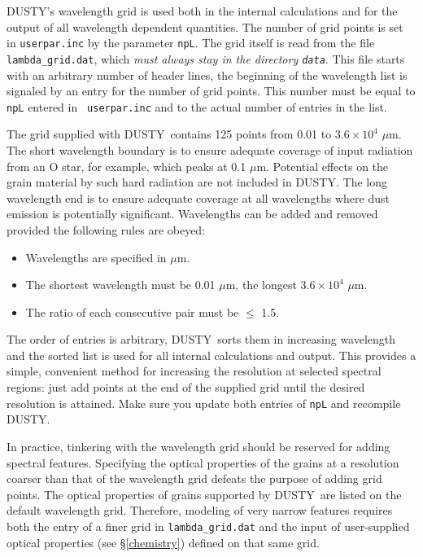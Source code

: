 \documentclass[11pt]{article}
\def\D    {{\sf DUSTY}}
\def\mic    {\hbox{$\mu$m}}
\begin{document}
\D's wavelength grid is used both in the internal calculations and for
the output of all wavelength dependent quantities. The number of grid
points is set in {\tt userpar.inc} by the parameter {\tt npL}. The
grid itself is read from the file {\tt lambda\_grid.dat}, which
\emph{must always stay in the directory {\tt data}}.  This file starts
with an arbitrary number of header lines, the beginning of the
wavelength list is signaled by an entry for the number of grid
points. This number must be equal to {\tt npL} entered in {\tt
  userpar.inc} and to the actual number of entries in the list.

The grid supplied with \D\ contains 125 points from 0.01 to
$3.6\times10^{4}$ \mic.  The short wavelength boundary is to ensure
adequate coverage of input radiation from an O star, for example,
which peaks at 0.1 \mic.  Potential effects on the grain material by
such hard radiation are not included in \D.  The long wavelength end
is to ensure adequate coverage at all wavelengths where dust emission
is potentially significant. Wavelengths can be added and removed
provided the following rules are obeyed:
\begin{itemize}
\item Wavelengths are specified in \mic.
\item The shortest wavelength must be 0.01 \mic, the longest
  $3.6\times10^{4}$ \mic.
\item The ratio of each consecutive pair must be $\le$ 1.5.
\end{itemize}
The order of entries is arbitrary, \D\ sorts them in increasing
wavelength and the sorted list is used for all internal calculations
and output.  This provides a simple, convenient method for increasing
the resolution at selected spectral regions: just add points at the
end of the supplied grid until the desired resolution is attained.
Make sure you update both entries of {\tt npL} and recompile \D.

In practice, tinkering with the wavelength grid should be reserved for
adding spectral features. Specifying the optical properties of the
grains at a resolution coarser than that of the wavelength grid
defeats the purpose of adding grid points. The optical properties of
grains supported by \D\ are listed on the default wavelength grid.
Therefore, modeling of very narrow features requires both the entry of
a finer grid in {\tt lambda\_grid.dat} and the input of user-supplied
optical properties (see \S\ref{chemistry}) defined on that same grid.


\end{document}
